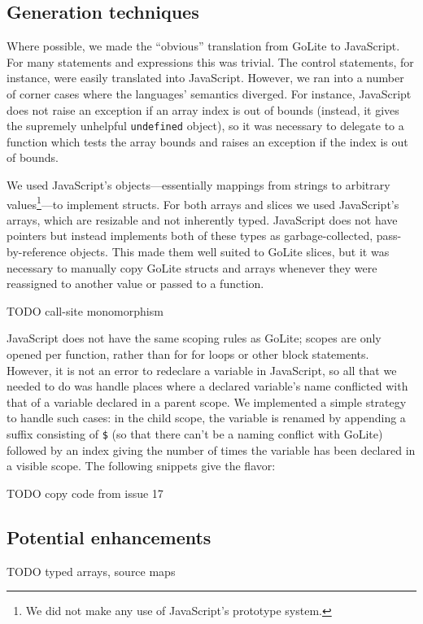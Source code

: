 \documentclass[oneside]{article}
\begin{document}
\subsection{Generation techniques}\label{subsec:gentech}
Where possible, we made the ``obvious'' translation from GoLite to JavaScript. For many statements and expressions this was trivial. The control statements, for instance, were easily translated into JavaScript. However, we ran into a number of corner cases where the languages' semantics diverged. For instance, JavaScript does not raise an exception if an array index is out of bounds (instead, it gives the supremely unhelpful \texttt{undefined} object), so it was necessary to delegate to a function which tests the array bounds and raises an exception if the index is out of bounds.

We used JavaScript's objects---essentially mappings from strings to arbitrary values\footnote{We did not make any use of JavaScript's prototype system.}---to implement structs. For both arrays and slices we used JavaScript's arrays, which are resizable and not inherently typed. JavaScript does not have pointers but instead implements both of these types as garbage-collected, pass-by-reference objects. This made them well suited to GoLite slices, but it was necessary to manually copy GoLite structs and arrays whenever they were reassigned to another value or passed to a function.

TODO call-site monomorphism

JavaScript does not have the same scoping rules as GoLite; scopes are only opened per function, rather than for for loops or other block statements. However, it is not an error to redeclare a variable in JavaScript, so all that we needed to do was handle places where a declared variable's name conflicted with that of a variable declared in a parent scope. We implemented a simple strategy to handle such cases: in the child scope, the variable is renamed by appending a suffix consisting of \texttt{\$} (so that there can't be a naming conflict with GoLite) followed by an index giving the number of times the variable has been declared in a visible scope. The following snippets give the flavor:

TODO copy code from issue 17

\subsection{Potential enhancements}
TODO typed arrays, source maps
\end{document}
